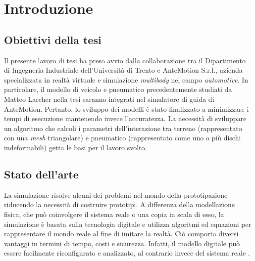 \chapter{Introduzione}
\label{Introduzione}
%
\section{Obiettivi della tesi}
Il presente lavoro di tesi ha preso avvio dalla collaborazione tra il Dipartimento di Ingegneria Industriale dell'Università di Trento e AnteMotion S.r.l., azienda specializzata in realtà virtuale e simulazione \textit{multibody} nel campo \textit{automotive}. In particolare, il modello di veicolo e pneumatico precedentemente studiati da Matteo Larcher nella tesi \cite{Larcher} saranno integrati nel simulatore di guida di AnteMotion. Pertanto, lo sviluppo dei modelli è stato finalizzato a minimizzare i tempi di esecuzione mantenendo invece l'accuratezza. La necessità di sviluppare un algoritmo che calcoli i parametri dell'interazione tra terreno (rappresentato con una \textit{mesh} triangolare) e pneumatico (rappresentato come uno o più dischi indeformabili) getta le basi per il lavoro svolto.
%
\section{Stato dell'arte}
La simulazione risolve alcuni dei problemi nel mondo della prototipazione riducendo la necessità di costruire prototipi. A differenza della modellazione fisica, che può coinvolgere il sistema reale o una copia in scala di esso, la simulazione è basata sulla tecnologia digitale e utilizza algoritmi ed equazioni per rappresentare il mondo reale al fine di imitare la realtà. Ciò comporta diversi vantaggi in termini di tempo, costi e sicurezza. Infatti, il modello digitale può essere facilmente riconfigurato e analizzato, al contrario invece del sistema reale \cite{Anu}.

